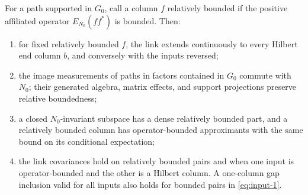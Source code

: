 \begin{lemma}
\label{lem:links-relative-boundedness}
For a path supported in \(G_0\), call a column \(f\) relatively
bounded if the positive affiliated operator
\(E_{N_0}(ff^*)\) is bounded. Then:
\begin{enumerate}[label=(\roman*)]
\item for fixed relatively bounded \(f\), the link extends
continuously to every Hilbert end column \(b\), and conversely
with the inputs reversed;
\item the image measurements of paths in factors contained in
\(G_0\) commute with \(N_0\); their generated algebra, matrix
effects, and support projections preserve relative boundedness;
\item a closed \(N_0\)-invariant subspace has a dense relatively
bounded part, and a relatively bounded column has operator-bounded
approximants with the same bound on its conditional expectation;
\item the link covariances hold on relatively bounded pairs and
when one input is operator-bounded and the other is a Hilbert
column. A one-column gap inclusion valid for all inputs also holds
for bounded pairs in \eqref{eq:input-1}.
\end{enumerate}
\end{lemma}

